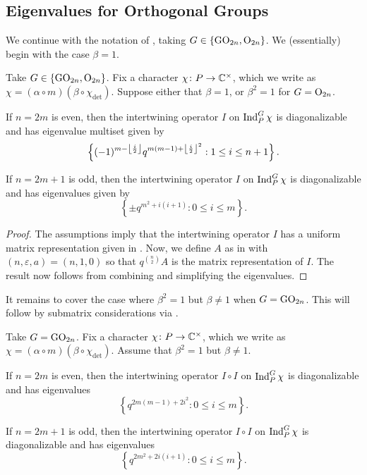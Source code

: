 \subsection{Eigenvalues for Orthogonal Groups}
We continue with the notation of , taking $G\in\{\mathrm{GO}_{2n},\mathrm{O}_{2n}\}$. We (essentially) begin with the case $\beta=1$.
\begin{theorem} \label{thm:o-trivial-eigens}
    Take $G\in\{\mathrm{GO}_{2n},\mathrm{O}_{2n}\}$. Fix a character $\chi\colon P\to\mathbb C^\times$, which we write as $\chi=(\alpha\circ m)(\beta\circ\chi_{\det})$. Suppose either that $\beta=1$, or $\beta^2=1$ for $G=\mathrm{O}_{2n}$.
    \begin{listalph}
        \item If $n=2m$ is even, then the intertwining operator $I$ on $\operatorname{Ind}_P^G\chi$ is diagonalizable and has eigenvalue multiset given by
        \[\left\{(-1)^{m-\left\lfloor{\frac i2}\right\rfloor}q^{m(m-1)+\left\lfloor{\frac i2}\right\rfloor^2}:1\le i\le n+1\right\}.\]
        \item If $n=2m+1$ is odd, then the intertwining operator $I$ on $\operatorname{Ind}_P^G\chi$ is diagonalizable and has eigenvalues given by
        \[\left\{\pm q^{m^2+i(i+1)}:0\le i\le m\right\}.\]
    \end{listalph}
\end{theorem}
\begin{proof}
    The assumptions imply that the intertwining operator $I$ has a uniform matrix representation given in . Now, we define $A$ as in  with $(n,\varepsilon,a)=(n,1,0)$ so that $q^{\binom n2}A$ is the matrix representation of $I$. The result now follows from combining  and simplifying the eigenvalues.
\end{proof}
It remains to cover the case where $\beta^2=1$ but $\beta\ne1$ when $G=\mathrm{GO}_{2n}$. This will follow by submatrix considerations via .
\begin{theorem} \label{thm:go-quad-eigens}
    Take $G=\mathrm{GO}_{2n}$. Fix a character $\chi\colon P\to\mathbb C^\times$, which we write as $\chi=(\alpha\circ m)(\beta\circ\chi_{\det})$. Assume that $\beta^2=1$ but $\beta\ne1$.
    \begin{listalph}
        \item If $n=2m$ is even, then the intertwining operator $I\circ I$ on $\operatorname{Ind}_P^G\chi$ is diagonalizable and has eigenvalues
        \[\left\{q^{2m(m-1)+2i^2}:0\le i\le m\right\}.\]
        \item If $n=2m+1$ is odd, then the intertwining operator $I\circ I$ on $\operatorname{Ind}_P^G\chi$ is diagonalizable and has eigenvalues
        \[\left\{q^{2m^2+2i(i+1)}:0\le i\le m\right\}.\]
    \end{listalph}
\end{theorem}
